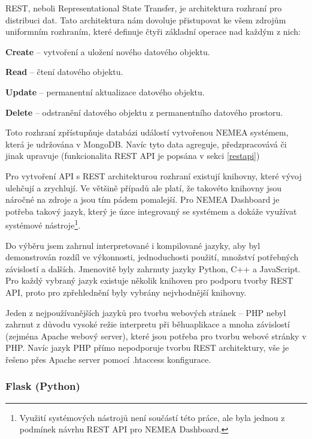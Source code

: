 REST, neboli Representational State Transfer, je architektura rozhraní pro distribuci dat. Tato architektura nám dovoluje přistupovat ke všem zdrojům uniformním rozhraním, které definuje čtyři základní operace nad každým z nich:

\begin{description}
    \item {\bf Create} -- vytvoření a uložení nového datového objektu.
    \item {\bf Read} -- čtení datového objektu.
    \item {\bf Update} -- permanentní aktualizace datového objektu.
    \item {\bf Delete} -- odstranění datového objektu z permanentního datového prostoru.
\end{description}

Toto rozhraní zpřístupňuje databázi událostí vytvořenou NEMEA systémem, která je udržována v MongoDB. Navíc tyto data agreguje, předzpracovává či jinak upravuje (funkcionalita REST API je popsána v sekci \ref{restapi})

Pro vytvoření API s REST architekturou rozhraní existují knihovny, které vývoj ulehčují a zrychlují. Ve většině případů ale platí, že takovéto knihovny jsou náročné na zdroje a jsou tím pádem pomalejší. Pro NEMEA Dashboard je potřeba takový jazyk, který je úzce integrovaný se systémem a dokáže využívat systémové nástroje\footnote{Využití systémových nástrojů není součástí této práce, ale byla jednou z podmínek návrhu REST API pro NEMEA Dashboard.}.

Do výběru jsem zahrnul interpretované i kompilované jazyky, aby byl demonstrován rozdíl ve výkonnosti, jednoduchosti použití, množství potřebných závislostí a dalších. Jmenovitě byly zahrnuty jazyky Python, C++ a JavaScript. Pro každý vybraný jazyk existuje několik knihoven pro podporu tvorby REST API, proto pro zpřehlednění byly vybrány nejvhodnější knihovny.

Jeden z nejpoužívanějších jazyků pro tvorbu webových stránek -- PHP nebyl zahrnut z důvodu vysoké režie interpretu při běhuaplikace a mnoha závislostí (zejména Apache webový server), které jsou potřeba pro tvorbu webové stránky v PHP. Navíc jazyk PHP přímo nepodporuje tvorbu REST architektury, vše je řešeno přes Apache server pomocí .htaccess konfigurace.

\subsubsection*{Flask (Python)}

